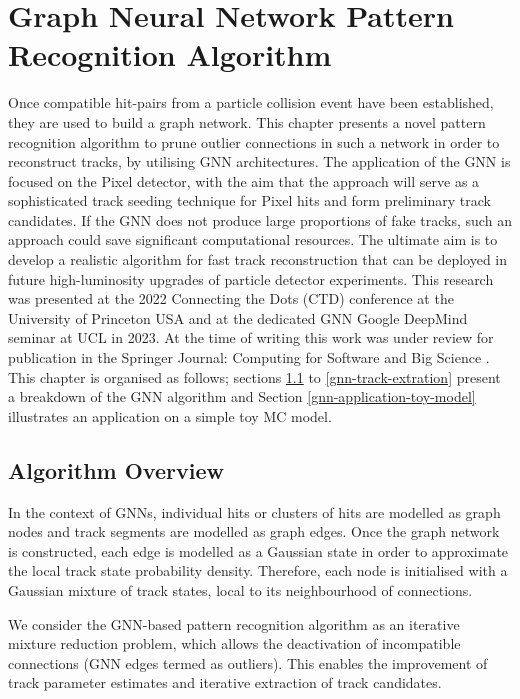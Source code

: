 
\chapter{Graph Neural Network Pattern Recognition Algorithm}\label{chapter-5}

Once compatible hit-pairs from a particle collision event have been established, they are used to build a graph network. This chapter presents a novel pattern recognition algorithm to prune outlier connections in such a network in order to reconstruct tracks, by utilising GNN architectures. The application of the GNN is focused on the Pixel detector, with the aim that the approach will serve as a sophisticated track seeding technique for Pixel hits and form preliminary track candidates. If the GNN does not produce large proportions of fake tracks, such an approach could save significant computational resources. The ultimate aim is to develop a realistic algorithm for fast track reconstruction that can be deployed in future high-luminosity upgrades of particle detector experiments. This research was presented at the 2022 Connecting the Dots (CTD) conference at the University of Princeton USA and at the dedicated GNN Google DeepMind seminar at UCL in 2023. At the time of writing this work was under review for publication in the Springer Journal: Computing for Software and Big Science \cite{Lad_2023_gnn}. This chapter is organised as follows; sections \ref{gnn-algorithm-overview} to \ref{gnn-track-extration} present a breakdown of the GNN algorithm and Section \ref{gnn-application-toy-model} illustrates an application on a simple toy MC model.


\section{Algorithm Overview}
\label{gnn-algorithm-overview}

In the context of GNNs, individual hits or clusters of hits are modelled as graph nodes and track segments are modelled as graph edges. Once the graph network is constructed, each edge is modelled as a Gaussian state in order to approximate the local track state probability density. Therefore, each node is initialised with a Gaussian mixture of track states, local to its neighbourhood of connections.

We consider the GNN-based pattern recognition algorithm as an iterative mixture reduction problem, which allows the deactivation of incompatible connections (GNN edges termed as outliers). This enables the improvement of track parameter estimates and iterative extraction of track candidates. 

